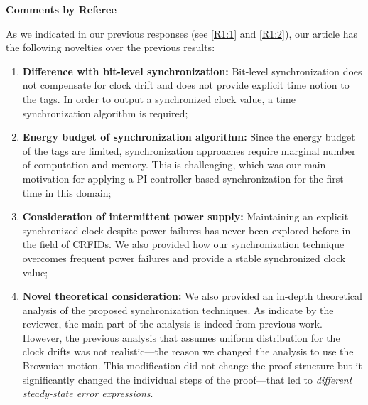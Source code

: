 \documentclass[10pt]{article}
\newcommand{\response}[1]{{\color{blue} #1}}
\newcounter{refereeCounter}
\newenvironment{responses}{%
\refstepcounter{refereeCounter}%
\textbf{\large Comments by Referee \therefereeCounter}
\begin{enumerate}%
\renewcommand{\labelenumi}{\textbf{[R\therefereeCounter :\,\arabic{enumi}]}} %
}{\end{enumerate}}
\begin{document}
\begin{responses}
\response{As we indicated in our previous responses (see \hyperref[R1:1]{[R1:1]} and \hyperref[R1:2]{[R1:2]}), our article has the following novelties over the previous results:
\begin{enumerate}
	\item \textbf{Difference with bit-level synchronization:} Bit-level synchronization does not compensate for clock drift and does not provide explicit time notion to the tags. In order to output a synchronized clock value, a time synchronization algorithm is required;
	\item \textbf{Energy budget of synchronization algorithm:} Since the energy budget of the tags are limited, synchronization approaches require marginal number of computation and memory. This is challenging, which was our main motivation for applying a PI-controller based synchronization for the first time in this domain;
	\item \textbf{Consideration of intermittent power supply:} Maintaining an explicit synchronized clock despite power failures has never been explored before in the field of CRFIDs. We also provided how our synchronization technique overcomes frequent power failures and provide a stable synchronized clock value;
	\item \textbf{Novel theoretical consideration:} We also provided an in-depth theoretical analysis of the proposed synchronization techniques. As indicate by the reviewer, the main part of the analysis is indeed from previous work. However, the previous analysis that assumes uniform distribution for the clock drifts was not realistic---the reason we changed the analysis to use the Brownian motion. This modification did not change the proof structure but it significantly changed the individual steps of the proof---that led to \emph{different steady-state error expressions}.
\end{enumerate}}

\end{responses}
\end{document}
